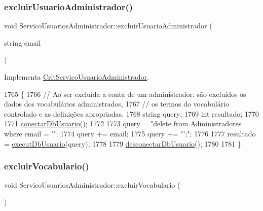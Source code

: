 \subsubsection{\texorpdfstring{excluir\+Usuario\+Administrador()}{excluirUsuarioAdministrador()}}
{\footnotesize\ttfamily void Servico\+Usuarios\+Administrador\+::excluir\+Usuario\+Administrador (\begin{DoxyParamCaption}\item[{string}]{email }\end{DoxyParamCaption})\hspace{0.3cm}{\ttfamily [virtual]}}



Implementa \mbox{\hyperlink{class_crlt_servico_usuario_administrador_ae45ee7ca343542d01898c2919e2671a1}{Crlt\+Servico\+Usuario\+Administrador}}.


\begin{DoxyCode}
1765 \{
1766   \textcolor{comment}{// Ao ser excluída a conta de um administrador, são excluídos os dados dos vocabulários
       administrados,}
1767   \textcolor{comment}{// os termos do vocabulário controlado e as definições apropriadas.}
1768   \textcolor{keywordtype}{string} query;
1769   \textcolor{keywordtype}{int} resultado;
1770 
1771   \mbox{\hyperlink{comando_sql_8cpp_a4f89ddcbc4cf8f2587d89f72f8c7900d}{conectarDbUsuario}}();
1772 
1773   query = \textcolor{stringliteral}{"delete from Administradores where email = '"};
1774   query += email;
1775   query += \textcolor{stringliteral}{"';"};
1776 
1777   resultado = \mbox{\hyperlink{comando_sql_8cpp_a748197580e7f9acdbf48c78de1f7924b}{executDbUsuario}}(query);
1778 
1779   \mbox{\hyperlink{comando_sql_8cpp_a969be9911913568e30d4ae8963338bc3}{desconectarDbUsuario}}();
1780 
1781 \}
\end{DoxyCode}
\mbox{\label{class_servico_usuarios_administrador_a13237b760df88f3f8a825a5bcd1d7331}} 
\subsubsection{\texorpdfstring{excluir\+Vocabulario()}{excluirVocabulario()}}
{\footnotesize\ttfamily void Servico\+Usuarios\+Administrador\+::excluir\+Vocabulario (\begin{DoxyParamCaption}{ }\end{DoxyParamCaption})\hspace{0.3cm}{\ttfamily [virtual]}}

